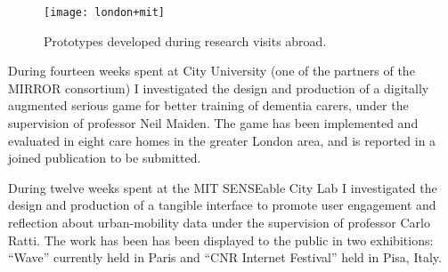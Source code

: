 \begin{figure}[tbh]
    \centering
    \texttt{[image: london+mit]}
    \caption{Prototypes developed during research visits abroad.}
    \label{fig:research-abroad}
\end{figure}

During fourteen weeks spent at City University (one of the partners of
the MIRROR consortium) I investigated the design and production of a
digitally augmented serious game for better training of dementia carers,
under the supervision of professor Neil Maiden. The game has been
implemented and evaluated in eight care homes in the greater London
area, and is reported in a joined publication to be submitted.

During twelve weeks spent at the MIT SENSEable City Lab I investigated
the design and production of a tangible interface to promote user
engagement and reflection about urban-mobility data under the
supervision of professor Carlo Ratti. The work has been has been
displayed to the public in two exhibitions: ``Wave'' currently held in
Paris and ``CNR Internet Festival'' held in Pisa,
Italy.
